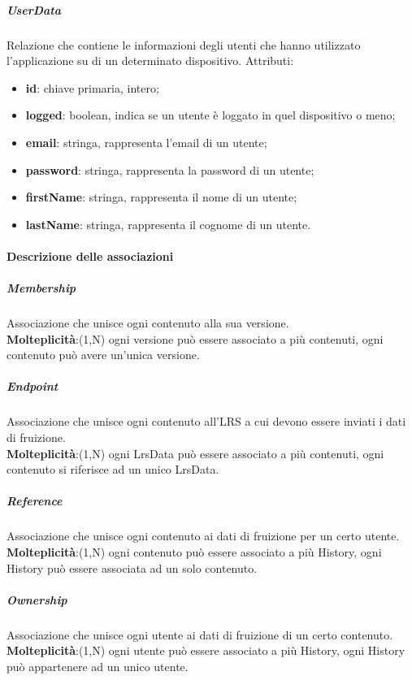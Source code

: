 \documentclass[../Tesi.tex]{subfiles}
\begin{document}
				\subparagraph*{UserData}
				Relazione che contiene le informazioni degli utenti che hanno utilizzato l'applicazione su di un determinato dispositivo. Attributi:
				\begin{itemize}
					\item \textbf{id}: chiave primaria, intero;
					\item \textbf{logged}: boolean, indica se un utente è loggato in quel dispositivo o meno;
					\item \textbf{email}: stringa, rappresenta l'email di un utente;
					\item \textbf{password}: stringa, rappresenta la password di un utente;
					\item \textbf{firstName}: stringa, rappresenta il nome di un utente;
					\item \textbf{lastName}: stringa, rappresenta il cognome di un utente.
				\end{itemize}

			\paragraph{Descrizione delle associazioni}
				\subparagraph*{Membership}
				Associazione che unisce ogni contenuto alla sua versione.\\
				\textbf{Molteplicità}:(1,N) ogni versione può essere associato a più contenuti, ogni contenuto può avere un'unica versione.

				\subparagraph*{Endpoint}
				Associazione che unisce ogni contenuto all'LRS a cui devono essere inviati i dati di fruizione.\\
				\textbf{Molteplicità}:(1,N) ogni LrsData può essere associato a più contenuti, ogni contenuto si riferisce ad un unico LrsData.

				\subparagraph*{Reference}
				Associazione che unisce ogni contenuto ai dati di fruizione per un certo utente.\\
				\textbf{Molteplicità}:(1,N) ogni contenuto può essere associato a più History, ogni History può essere associata ad un solo contenuto.

				\subparagraph*{Ownership}
				Associazione che unisce ogni utente ai dati di fruizione di un certo contenuto.\\
				\textbf{Molteplicità}:(1,N) ogni utente può essere associato a più History, ogni History può appartenere ad un unico utente.
\end{document}
